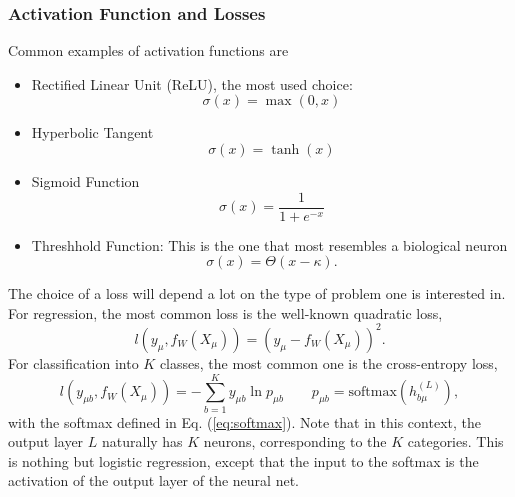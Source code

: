 \documentclass{article}
\begin{document}
\subsubsection*{Activation Function and Losses}
Common examples of activation functions are
\begin{itemize}
    \item Rectified Linear Unit (ReLU), the most used choice:
    \begin{equation}
        \sigma(x) = \max(0,x)
    \end{equation}
    \item Hyperbolic Tangent
    \begin{equation}
        \sigma(x) = \tanh(x)
    \end{equation}
    \item Sigmoid Function
    \begin{equation}
        \sigma(x) = \frac{1}{1+e^{-x}}
    \end{equation}
    \item Threshhold Function: This is the one that most resembles a biological neuron
    \begin{equation}
        \sigma(x) = \Theta(x-\kappa).
    \end{equation}
\end{itemize}
The choice of a loss will depend a lot on the type of problem one is interested in. For regression, the most common loss is the well-known quadratic loss,
\begin{equation}
    l(y_{\mu}, f_W(X_{\mu}))
    =
    (y_{\mu} - f_W(X_{\mu}))^2.
\end{equation}
For classification into $K$ classes, the most common one is the cross-entropy loss,
\begin{equation}
    l(y_{\mu b}, f_W(X_{\mu}))
    =
    - \sum_{b=1}^{K}y_{\mu b} \ln{p_{\mu b}}
    \quad\quad
    p_{\mu b}
    =
    \text{softmax}\left(h^{(L)}_{b \mu}\right),
\end{equation}
with the softmax defined in Eq. (\ref{eq:softmax}). Note that in this context, the output layer $L$ naturally has $K$ neurons, corresponding to the $K$ categories. This is nothing but logistic regression, except that the input to the softmax is the activation of the output layer of the neural net.
\end{document}
